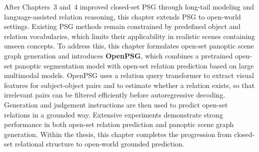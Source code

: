 After Chapters~3 and~4 improved closed-set PSG through long-tail modeling and language-assisted relation reasoning, this chapter extends PSG to open-world settings.
Existing PSG methods remain constrained by predefined object and relation vocabularies, which limits their applicability in realistic scenes containing unseen concepts.
To address this, this chapter formulates open-set panoptic scene graph generation and introduces \textbf{OpenPSG}, which combines a pretrained open-set panoptic segmentation model with open-set relation prediction based on large multimodal models.
OpenPSG uses a relation query transformer to extract visual features for subject-object pairs and to estimate whether a relation exists, so that irrelevant pairs can be filtered efficiently before autoregressive decoding.
Generation and judgement instructions are then used to predict open-set relations in a grounded way.
Extensive experiments demonstrate strong performance in both open-set relation prediction and panoptic scene graph generation.
Within the thesis, this chapter completes the progression from closed-set relational structure to open-world grounded prediction.
